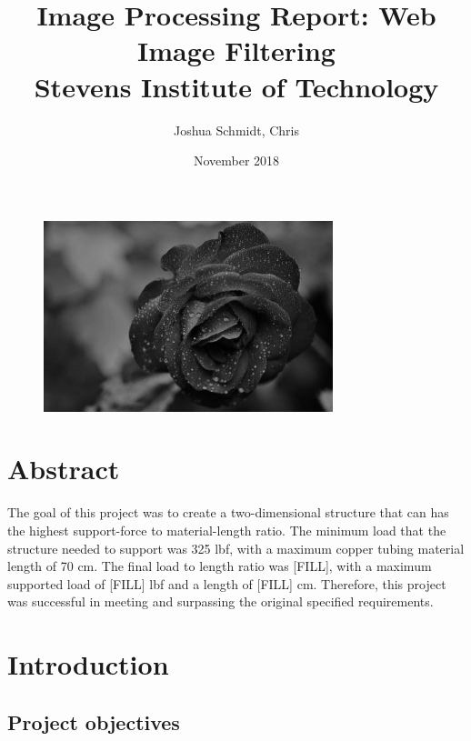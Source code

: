 \documentclass{article}
\title{%
    Image Processing Report: Web Image Filtering \\
    \large Stevens Institute of Technology}
\date{November 2018}
\author{Joshua Schmidt, Chris}
\let\Oldsection\section
\renewcommand{\section}{\FloatBarrier\Oldsection}
\let\Oldsubsection\subsection
\renewcommand{\subsection}{\FloatBarrier\Oldsubsection}
\begin{document}
  
  \maketitle
  
  \bigskip
  \bigskip
  \bigskip
  \bigskip
  
  \begin{figure}[!htb]
    \centering
    \includegraphics[width=0.75\textwidth]{assets/logo.png}
    \label{fig:logo}
  \end{figure}
  
  \newpage
  
  \tableofcontents
  
  \newpage
  
  
  \section{Abstract}
  
  The goal of this project was to create a two-dimensional structure that can has the highest support-force to material-length ratio. The minimum load that the structure needed to support was 325 lbf, with a maximum copper tubing material length of 70 cm. The final load to length ratio was [FILL], with a maximum supported load of [FILL] lbf and a length of [FILL] cm. Therefore, this project was successful in meeting and surpassing the original specified requirements.
  
  \newpage
  
  \section{Introduction}
  
  \subsection{Project objectives}
  
\end{document}
